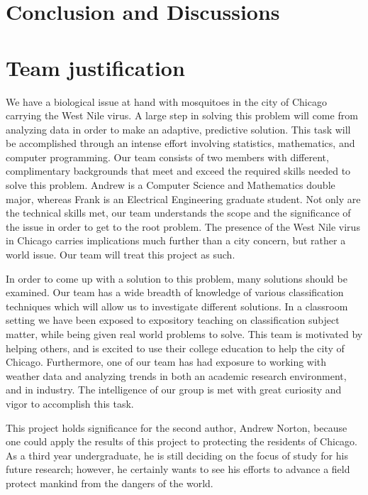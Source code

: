 \documentclass{article} %
\begin{document}
\section{Conclusion and Discussions}

\section{Team justification}

We have a biological issue at hand with mosquitoes in the city of Chicago carrying the West Nile virus.  A large step in solving this problem will come from analyzing data in order to make an adaptive, predictive solution.  This task will be accomplished through an intense effort involving statistics, mathematics, and computer programming.  Our team consists of two members with different, complimentary backgrounds that meet and exceed the required skills needed to solve this problem.  Andrew is a Computer Science and Mathematics double major, whereas Frank is an Electrical Engineering graduate student. Not only are the technical skills met, our team understands the scope and the significance of the issue in order to get to the root problem.  The presence of the West Nile virus in Chicago carries implications much further than a city concern, but rather a world issue.  Our team will treat this project as such.  

In order to come up with a solution to this problem, many solutions should be examined.  Our team has a wide breadth of knowledge of various classification techniques which will allow us to investigate different solutions.  In a classroom setting we have been exposed to expository teaching on classification subject matter, while being given real world problems to solve.  This team is motivated by helping others, and is excited to use their college education to help the city of Chicago. Furthermore, one of our team has had exposure to working with weather data and analyzing trends in both an academic research environment, and in industry.   The intelligence of our group is met with great curiosity and vigor to accomplish this task.

This project holds significance for the second author, Andrew Norton, because one could apply the results of this project to protecting the residents of Chicago.  As a third year undergraduate, he is still deciding on the focus of study for his future research; however, he certainly wants to see his efforts to advance a field protect mankind from the dangers of the world.  
\end{document}
